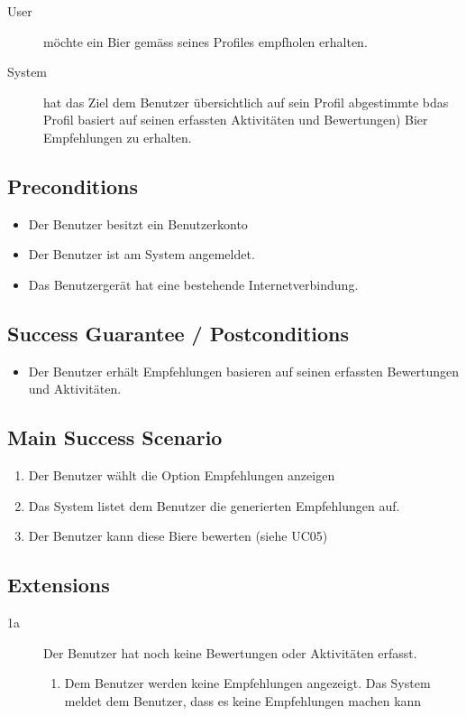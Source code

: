 \documentclass[10pt,a4paper]{scrartcl}
\begin{document}
\begin{description}
\item[User] möchte ein Bier gemäss seines Profiles empfholen erhalten.
\item[System] hat das Ziel dem Benutzer übersichtlich auf sein Profil abgestimmte bdas Profil basiert auf seinen erfassten Aktivitäten und Bewertungen) Bier Empfehlungen zu erhalten.
\end{description}


\subsection*{Preconditions}

\begin{itemize}
\item Der Benutzer besitzt ein Benutzerkonto
\item Der Benutzer ist am System angemeldet.
\item Das Benutzergerät hat eine bestehende Internetverbindung.
\end{itemize}


\subsection*{Success Guarantee / Postconditions}
\begin{itemize}
\item Der Benutzer erhält Empfehlungen basieren auf seinen erfassten Bewertungen und Aktivitäten.
\end{itemize}


\subsection*{Main Success Scenario}

\begin{enumerate}
\item Der Benutzer wählt die Option Empfehlungen anzeigen
\item Das System listet dem Benutzer die generierten Empfehlungen auf.
\item Der Benutzer kann diese Biere bewerten (siehe UC05)
\end{enumerate}


\subsection*{Extensions}

\begin{description}
\item[1a] Der Benutzer hat noch keine Bewertungen oder Aktivitäten erfasst.
	\begin{enumerate}
	\item Dem Benutzer werden keine Empfehlungen angezeigt. Das System meldet dem Benutzer, dass es keine Empfehlungen machen kann
	\end{enumerate}

\end{description}
\end{document}
